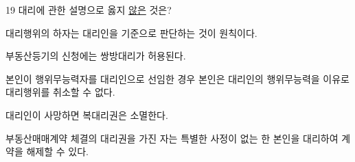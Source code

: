 \begin{question}{19}
대리에 관한 설명으로 옳지 \uline{않은} 것은?
\begin{choices}
  \item 대리행위의 하자는 대리인을 기준으로 판단하는 것이 원칙이다.
  \item 부동산등기의 신청에는 쌍방대리가 허용된다.
  \item 본인이 행위무능력자를 대리인으로 선임한 경우 본인은 대리인의 행위무능력을 이유로 대리행위를 취소할 수 없다.
  \item 대리인이 사망하면 복대리권은 소멸한다.
  \item 부동산매매계약 체결의 대리권을 가진 자는 특별한 사정이 없는 한 본인을 대리하여 계약을 해제할 수 있다.
\end{choices}
\end{question}
